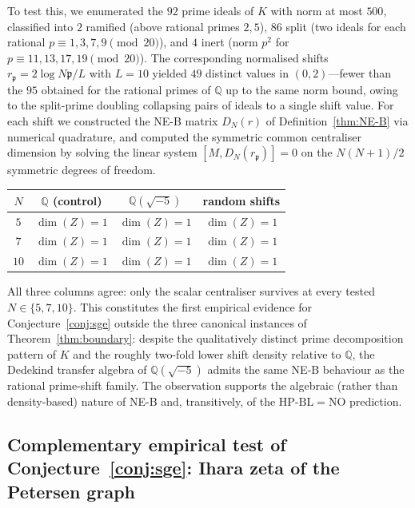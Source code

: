 \documentclass[11pt]{article}
\theoremstyle{definition}
\theoremstyle{remark}
\newcommand{\HBL}{\mathrm{HP\text{-}BL}}
\begin{document}
To test this, we enumerated the $92$ prime ideals of $K$ with norm
at most $500$, classified into $2$ ramified (above rational primes
$2, 5$), $86$ split (two ideals for each rational $p \equiv 1, 3, 7,
9 \pmod{20}$), and $4$ inert (norm $p^2$ for $p \equiv 11, 13, 17,
19 \pmod{20}$). The corresponding normalised shifts $r_\mathfrak{p}
= 2\log N\mathfrak{p}/L$ with $L = 10$ yielded $49$ distinct values
in $(0, 2)$---fewer than the $95$ obtained for the rational primes
of $\mathbb{Q}$ up to the same norm bound, owing to the split-prime
doubling collapsing pairs of ideals to a single shift value. For each
shift we constructed the NE-B matrix $D_N(r)$ of
Definition~\ref{thm:NE-B} via numerical quadrature, and computed
the symmetric common centraliser dimension by solving the linear
system $[M, D_N(r_\mathfrak{p})] = 0$ on the $N(N+1)/2$ symmetric
degrees of freedom.

\begin{center}
\begin{tabular}{@{}c c c c@{}}
\toprule
$N$ & $\mathbb{Q}$ (control) & $\mathbb{Q}(\sqrt{-5})$ & random shifts \\
\midrule
$5$ & $\dim(Z) = 1$ & $\dim(Z) = 1$ & $\dim(Z) = 1$ \\
$7$ & $\dim(Z) = 1$ & $\dim(Z) = 1$ & $\dim(Z) = 1$ \\
$10$ & $\dim(Z) = 1$ & $\dim(Z) = 1$ & $\dim(Z) = 1$ \\
\bottomrule
\end{tabular}
\end{center}

All three columns agree: only the scalar centraliser survives at
every tested $N \in \{5, 7, 10\}$. This constitutes the first
empirical evidence for Conjecture~\ref{conj:sge} outside the
three canonical instances of Theorem~\ref{thm:boundary}: despite the
qualitatively distinct prime decomposition pattern of $K$ and the
roughly two-fold lower shift density relative to $\mathbb{Q}$, the
Dedekind transfer algebra of $\mathbb{Q}(\sqrt{-5})$ admits the same
NE-B behaviour as the rational prime-shift family. The observation
supports the algebraic (rather than density-based) nature of NE-B
and, transitively, of the $\HBL = \mathrm{NO}$ prediction.

\subsection{Complementary empirical test of
Conjecture~\ref{conj:sge}: Ihara zeta of the Petersen graph}
\label{sec:sge-ihara-test}
\end{document}
